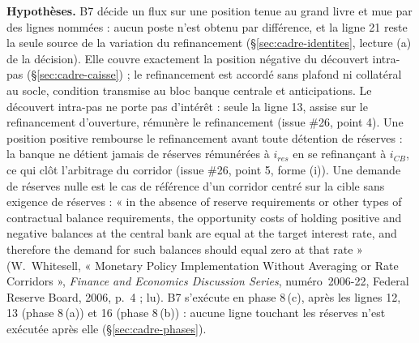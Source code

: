 \documentclass[11pt,a4paper]{article}
\newcommand{\hyp}{\par\noindent\textbf{Hypothèses.} }
\begin{document}
\begin{proposee}
\begin{lecture}
\hyp B7 décide un flux sur une position tenue au grand livre et mue par des lignes nommées : aucun poste n'est obtenu par différence, et la ligne 21 reste la seule source de la variation du refinancement (\S\ref{sec:cadre-identites}, lecture (a) de la décision). Elle couvre exactement la position négative du découvert intra-pas (\S\ref{sec:cadre-caisse}) ; le refinancement est accordé sans plafond ni collatéral au socle, condition transmise au bloc banque centrale et anticipations. Le découvert intra-pas ne porte pas d'intérêt : seule la ligne 13, assise sur le refinancement d'ouverture, rémunère le refinancement (issue \#26, point 4). Une position positive rembourse le refinancement avant toute détention de réserves : la banque ne détient jamais de réserves rémunérées à $i_{\mathit{res}}$ en se refinançant à $i_{\mathit{CB}}$, ce qui clôt l'arbitrage du corridor (issue \#26, point 5, forme (i)). Une demande de réserves nulle est le cas de référence d'un corridor centré sur la cible sans exigence de réserves : « in the absence of reserve requirements or other types of contractual balance requirements, the opportunity costs of holding positive and negative balances at the central bank are equal at the target interest rate, and therefore the demand for such balances should equal zero at that rate » (W.~Whitesell, « Monetary Policy Implementation Without Averaging or Rate Corridors », \emph{Finance and Economics Discussion Series}, numéro~2006-22, Federal Reserve Board, 2006, p.~4 ; lu). B7 s'exécute en phase 8\,(c), après les lignes 12, 13 (phase 8\,(a)) et 16 (phase 8\,(b)) : aucune ligne touchant les réserves n'est exécutée après elle (\S\ref{sec:cadre-phases}).

\end{lecture}
\end{proposee}
\end{document}
